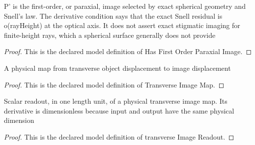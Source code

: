 \begin{definition}
  \label{def:physics:phyx-mini-0040:phyxminiproblems-problemphyxmini0040-hasfirstorderparaxialimage}
  P' is the first-order, or paraxial, image selected by exact spherical geometry and Snell's law. The derivative condition says that the exact Snell residual is o(rayHeight) at the optical axis. It does not assert exact stigmatic imaging for finite-height rays, which a spherical surface generally does not provide
\end{definition}
\begin{proof}
  This is the declared model definition of Has First Order Paraxial Image.
\end{proof}
\begin{definition}
  \label{def:physics:phyx-mini-0040:phyxminiproblems-problemphyxmini0040-transverseimagemap}
  A physical map from transverse object displacement to image displacement
\end{definition}
\begin{proof}
  This is the declared model definition of Transverse Image Map.
\end{proof}
\begin{definition}
  \label{def:physics:phyx-mini-0040:phyxminiproblems-problemphyxmini0040-transverseimagereadout}
  Scalar readout, in one length unit, of a physical transverse image map. Its derivative is dimensionless because input and output have the same physical dimension
\end{definition}
\begin{proof}
  This is the declared model definition of transverse Image Readout.
\end{proof}
